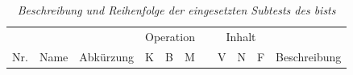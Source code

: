 \documentclass[11pt, twoside, a4paper]{book}		%
\begin{document}
\begin{table}
	\captionsetup{labelsep = none}
	\caption[Die verwendeten Subtests des \gls{bist}s]{\newline  \textit{Beschreibung und Reihenfolge der eingesetzten Subtests des \gls{bist}s} \vspace{.2cm}}
	\label{tab:bis_subtest_description}
	\begin{adjustbox}{width=\textwidth,totalheight=.9\textheight,keepaspectratio}
		\begin{threeparttable}
			\begin{tabular}{l l c c c c p{.0001cm} c c c p{20cm}}
				\hline
					&		&		& \multicolumn{3}{c}{Operation}	&	&	\multicolumn{3}{c}{Inhalt}	&		\\
				\cline{4-6}
				\cline{8-10}
				\multicolumn{1}{c}{Nr.}	&	\multicolumn{1}{c}{Name}	&	\multicolumn{1}{c}{Abkürzung}	&		K	&	B	&	M		&	&		V	&	N	&	F		&	\multicolumn{1}{c}{Beschreibung}	\\
				

\end{tabular}
\end{threeparttable}
\end{adjustbox}
\end{table}
\end{document}
